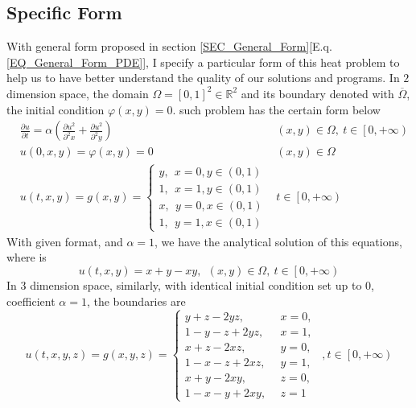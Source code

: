 \subsection{Specific Form}\label{SEC:Specific_Form}
With general form proposed in section \ref{SEC_General_Form}[E.q. \ref{EQ_General_Form_PDE}],
I specify a particular form of this heat problem to help us to have better understand the quality of our 
solutions and programs.
In $2$ dimension space, the domain $\Omega = \left[ 0, 1\right] ^2 \in \mathbb{R}^2$ and its boundary
denoted with $\overline{\Omega}$, the initial condition $\varphi(x,y) = 0$.
such problem has the certain form below
\begin{align}\label{EQ:Heat2D}
  &\frac{\partial u}{\partial t} = \alpha \left(
    \frac{\partial u^2}{\partial^2 x}
    +
    \frac{\partial u^2}{\partial^2 y}
  \right) &(x,y) \in \Omega, \: t \in \left[0, +\infty\right)  \nonumber\\
  &u(0,x,y)  = \varphi(x,y) = 0 &(x,y) \in \Omega\\
  &u(t,x,y)
   = g(x,y)
   = \begin{cases}
    y, \:\: x=0, y\in\left(0,1\right)\\
    1, \:\: x=1, y\in\left(0,1\right)\\
    x, \:\: y=0, x\in\left(0,1\right)\\
    1, \:\: y =1, x\in\left(0,1\right)
  \end{cases}
  &t \in \left[0, +\infty\right) \nonumber
\end{align}
With given format, and $\alpha = 1$, we have the analytical solution of this equations, where is 
\begin{equation}\label{EQ_SOLUTION_2D}
  u(t,x,y) = x + y - xy, \:\:(x,y) \in \Omega,\: t \in \left[0, +\infty\right)
\end{equation}
In 3 dimension space, similarly, with identical initial condition set up to $0$, coefficient $\alpha = 1$,
the boundaries are 
\begin{equation} 
  u(t,x,y,z) = g(x,y,z) = 
  \begin{cases}
    y+z -2yz        , \:\: &x=0,\\
    1 - y - z + 2yz , \:\: &x=1,\\
    x+z - 2xz       , \:\: &y=0,\\
    1 - x - z + 2xz , \:\: &y =1,\\
    x+y - 2xy       , \:\: &z=0,\\
    1 - x - y + 2xy , \:\: &z=1
  \end{cases}
  \:\:, t \in \left[0, +\infty\right)
\end{equation}
